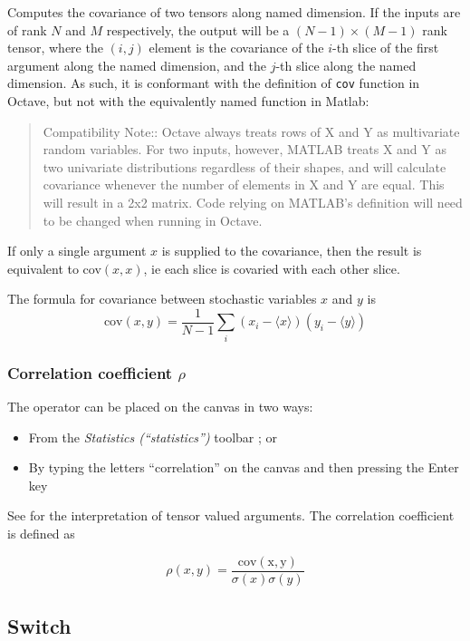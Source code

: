 Computes the covariance of two tensors along named dimension. If the
inputs are of rank $N$ and $M$ respectively, the output will be
a $(N-1)\times(M-1)$ rank tensor, where the $(i,j)$ element is the
covariance of the $i$-th slice of the first argument along the named
dimension, and the $j$-th slice along the named dimension. As such,
it is conformant with the definition of \texttt{cov} function in Octave,
but not with the equivalently named function in Matlab: 
\begin{quote}
Compatibility Note:: Octave always treats rows of X and Y as multivariate
random variables. For two inputs, however, MATLAB treats X and Y as
two univariate distributions regardless of their shapes, and will
calculate covariance whenever the number of elements in X and Y are
equal. This will result in a 2x2 matrix. Code relying on MATLAB's
definition will need to be changed when running in Octave. 
\end{quote}
If only a single argument $x$ is supplied to the covariance, then
the result is equivalent to cov$(x,x)$, ie each slice is covaried
with each other slice.

The formula for covariance between stochastic variables $x$ and $y$
is 
\[
\mathrm{cov}(x,y)=\frac{1}{N-1}\sum_{i}(x_{i}-\langle x\rangle)(y_{i}-\langle y\rangle)
\]

\subsubsection{Correlation coefficient $\rho$}\label{Operation:correlation}

\label{Operation:rho}


The operator can be placed on the canvas in two ways:
\begin{itemize}
\item From the \emph{Statistics (``statistics'')} toolbar ;
or 
\item By typing the letters ``correlation'' on the canvas and then pressing
the Enter key
\end{itemize}
See  for the interpretation of tensor valued
arguments. The correlation coefficient is defined as

\[
\rho(x,y)=\frac{\mathrm{cov(x,y)}}{\sigma(x)\sigma(y)}
\]


\subsection{Switch}

